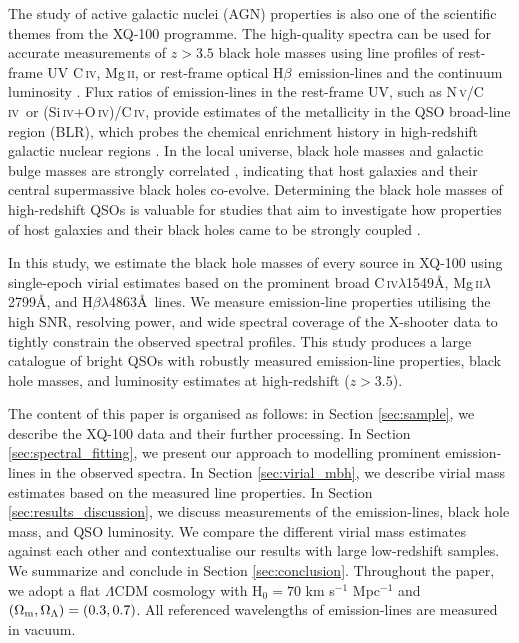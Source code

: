\documentclass[fleqn,usenatbib]{mnras}
\newcommand{\mgii}{Mg\,\textsc{ii}}
\newcommand{\civ}{C\,\textsc{iv}}
\newcommand{\nv}{N\,\textsc{v}}
\newcommand{\siiv}{Si\,\textsc{iv}}
\newcommand{\oiv}{O\,\textsc{iv}}
\newcommand{\hbeta}{H\textsc{$\beta$}}
\newcommand{\mgiil}{Mg\,\textsc{ii}$\lambda$2799}
\newcommand{\civl}{C\,\textsc{iv}$\lambda$1549}
\newcommand{\hbetal}{H\textsc{$\beta$}$\lambda$4863}
\newcommand{\nvciv}{\nv/\civ}
\newcommand{\siivoivciv}{(\siiv+\oiv)/\civ}
\begin{document}
The study of active galactic nuclei (AGN) properties is also one of the scientific themes from the XQ-100 programme. The high-quality spectra can be used for accurate measurements of $z > 3.5$ black hole masses using line profiles of rest-frame UV \civ, \mgii, or rest-frame optical \hbeta\ emission-lines and the continuum luminosity \citep[e.g.,][]{Mclure_2004, Greene_2005, Vestergaard_2006, Vestergaard_2009}. Flux ratios of emission-lines in the rest-frame UV, such as \nvciv\ or \siivoivciv, provide estimates of the metallicity in the QSO broad-line region (BLR), which probes the chemical enrichment history in high-redshift galactic nuclear regions \citep[e.g.,][]{Hamann_1999, Hamann_2002, Nagao_2006, Wang_2012, Xu_2018, Wang_2021, Lai_2022}. In the local universe, black hole masses and galactic bulge masses are strongly correlated \citep[the $\rm{M}_{\rm{BH}}-\rm{M}_{\rm{bulge}}$ relation;][]{Marconi_2003, Haring_2004, Greene_2010}, indicating that host galaxies and their central supermassive black holes co-evolve. Determining the black hole masses of high-redshift QSOs is valuable for studies that aim to investigate how properties of host galaxies and their black holes came to be strongly coupled \citep[e.g.,][]{Croton_2006, McConnell_2013, Terrazas_2020}.

In this study, we estimate the black hole masses of every source in XQ-100 using single-epoch virial estimates based on the prominent broad \civl\AA, \mgiil\AA, and \hbetal\AA\ lines. We measure emission-line properties utilising the high SNR, resolving power, and wide spectral coverage of the X-shooter data to tightly constrain the observed spectral profiles. This study produces a large catalogue of bright QSOs with robustly measured emission-line properties, black hole masses, and luminosity estimates at high-redshift ($z > 3.5$).

The content of this paper is organised as follows: in Section \ref{sec:sample}, we describe the XQ-100 data and their further processing. In Section \ref{sec:spectral_fitting}, we present our approach to modelling prominent emission-lines in the observed spectra. In Section \ref{sec:virial_mbh}, we describe virial mass estimates based on the measured line properties. In Section \ref{sec:results_discussion}, we discuss measurements of the emission-lines, black hole mass, and QSO luminosity. We compare the different virial mass estimates against each other and contextualise our results with large low-redshift samples. We summarize and conclude in Section \ref{sec:conclusion}. Throughout the paper, we adopt a flat $\Lambda$CDM cosmology with H$_{0} = 70$ km s$^{-1}$ Mpc$^{-1}$ and $\left(\Omega_{\rm m}, \Omega_{\Lambda}\right) = \left(0.3, 0.7\right)$. All referenced wavelengths of emission-lines are measured in vacuum.
\end{document}
